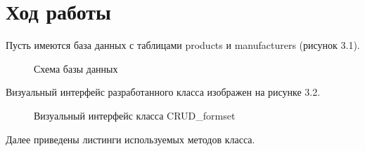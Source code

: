 \section{Ход работы}

Пусть имеются база данных с таблицами products и manufacturers (рисунок 3.1).

\begin{figure}[h!]
    \center{\texttt{[image: db]}}
  \caption{Схема базы данных}
\end{figure}

Визуальный интерфейс разработанного класса изображен на рисунке 3.2.

\begin{figure}[h!]
  \caption{Визуальный интерфейс класса CRUD\_formset}
\end{figure}

Далее приведены листинги используемых методов класса.

